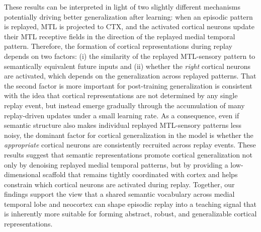 \documentclass{article}
\providecommand{\DIFaddtex}[1]{{\protect\color{blue}\uwave{#1}}} %
\providecommand{\DIFaddbegin}{} %
\providecommand{\DIFaddend}{} %
\providecommand{\DIFadd}[1]{\texorpdfstring{\DIFaddtex{#1}}{#1}} %
\begin{document}
\newline\newline
These results can be interpreted in light of two slightly different mechanisms potentially driving better generalization after learning: when an episodic pattern is replayed, MTL is projected to CTX, and the activated cortical neurons update their MTL receptive fields in the direction of the replayed medial temporal pattern. Therefore, the formation of cortical representations during replay depends on two factors: (i) the similarity of the replayed MTL-sensory pattern to semantically equivalent future \DIFaddbegin \DIFadd{sensory }\DIFaddend inputs and (ii) whether the \textit{right} cortical neurons are activated, which depends on the generalization across replayed patterns. That the second factor is more important for post-training generalization is consistent with the idea that cortical representations are not determined by any single replay event, but instead emerge gradually through the accumulation of many replay-driven updates under a small learning rate. As a consequence, even if semantic structure also makes individual replayed MTL-sensory patterns less noisy, the dominant factor for cortical generalization in the model is whether the \textit{appropriate} cortical neurons are consistently recruited across replay events.
\newline\newline
These results suggest that semantic representations promote cortical generalization not only by denoising replayed medial temporal patterns, but by providing a low-dimensional scaffold that remains tightly coordinated with cortex and helps constrain which cortical neurons are activated during replay. Together, our findings support the view that a shared semantic vocabulary across medial temporal lobe and neocortex can shape episodic replay into a teaching signal that is inherently more suitable for forming abstract, robust, and generalizable cortical representations.
\end{document}
